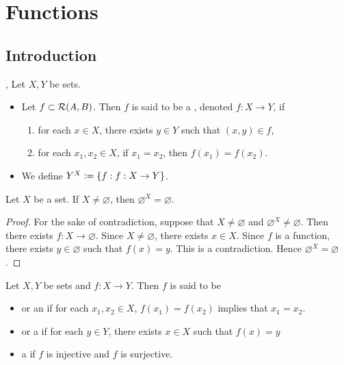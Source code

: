 \documentclass{book}
\begin{document}
	
	
	
	
	
	
	
	
	
	
	
	
	
	
	
	\newpage
	\section{Functions}
	
	\subsection{Introduction}
	
	\begin{defn}
		, 
		Let $X,Y$ be sets. 
		\begin{itemize}
			\item Let $f \subset \mathcal{R}(A,B)$. Then $f$ is said to be a , denoted $f:X \rightarrow Y$, if 
			\begin{enumerate}
				\item for each $x \in X$, there exists $y \in Y$ such that $(x,y) \in f$,
				\item for each $x_1, x_2 \in X$, if $x_1 = x_2$, then $f(x_1) = f(x_2)$. 
			\end{enumerate}
			\item We define $Y^X \vcentcolon= \{f: f:X \rightarrow Y\}$.
		\end{itemize}
	\end{defn}
	
	\begin{ex}
		Let $X$ be a set. If $X \neq \varnothing$, then $\varnothing^{X} = \varnothing$. 
	\end{ex}
	
	\begin{proof}
		For the sake of contradiction, suppose that $X \neq \varnothing$ and $\varnothing^{X} \neq \varnothing$. Then there exists $f:X \rightarrow \varnothing$. Since $X \neq \varnothing$, there exists $x \in X$. Since $f$ is a function, there exists $y \in \varnothing$ such that $f(x) = y$. This is a contradiction. Hence $\varnothing^{X} = \varnothing$.
	\end{proof}
	
	\begin{defn}
		Let $X,Y$ be sets and $f:X \rightarrow Y$. Then $f$ is said to be 
		\begin{itemize}
			\item {} or an  if for each $x_1, x_2 \in X$, $f(x_1) = f(x_2)$ implies that $x_1 = x_2$.
			\item {} or a  if for each $y \in Y$, there exists $x \in X$ such that $f(x) = y$
			\item {} a  if $f$ is injective and $f$ is surjective.
		\end{itemize}
	\end{defn}
	
\end{document}
